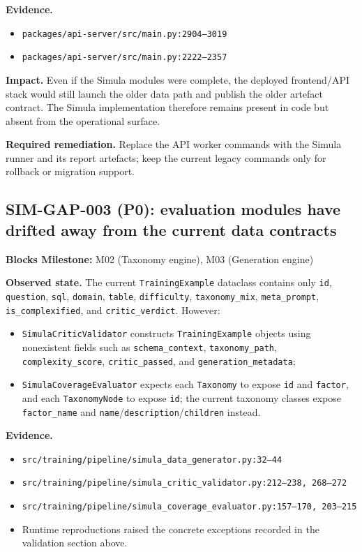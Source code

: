 \documentclass[12pt,a4paper,twoside]{report}
\begin{document}
\textbf{Evidence.}
\begin{itemize}
\item \texttt{packages/api-server/src/main.py:2904--3019}
\item \texttt{packages/api-server/src/main.py:2222--2357}
\end{itemize}

\textbf{Impact.}
Even if the Simula modules were complete, the deployed frontend/API
stack would still launch the older data path and publish the older
artefact contract. The Simula implementation therefore remains
present in code but absent from the operational surface.

\textbf{Required remediation.}
Replace the API worker commands with the Simula runner and its report
artefacts; keep the current legacy commands only for rollback or
migration support.

\subsection*{SIM-GAP-003 (P0): evaluation modules have drifted away from the current data contracts}
\label{gap:sim-003}
\textbf{Blocks Milestone:} M02 (Taxonomy engine), M03 (Generation engine)

\textbf{Observed state.}
The current \texttt{TrainingExample} dataclass contains only
\texttt{id}, \texttt{question}, \texttt{sql}, \texttt{domain},
\texttt{table}, \texttt{difficulty}, \texttt{taxonomy\_mix},
\texttt{meta\_prompt}, \texttt{is\_complexified}, and
\texttt{critic\_verdict}. However:
\begin{itemize}
\item \texttt{SimulaCriticValidator} constructs
\texttt{TrainingExample} objects using nonexistent fields such as
\texttt{schema\_context}, \texttt{taxonomy\_path},
\texttt{complexity\_score}, \texttt{critic\_passed}, and
\texttt{generation\_metadata};
\item \texttt{SimulaCoverageEvaluator} expects each
\texttt{Taxonomy} to expose \texttt{id} and \texttt{factor}, and
each \texttt{TaxonomyNode} to expose \texttt{id}; the current
taxonomy classes expose \texttt{factor\_name} and
\texttt{name}/\texttt{description}/\texttt{children} instead.
\end{itemize}

\textbf{Evidence.}
\begin{itemize}
\item \texttt{src/training/pipeline/simula\_data\_generator.py:32--44}
\item \texttt{src/training/pipeline/simula\_critic\_validator.py:212--238, 268--272}
\item \texttt{src/training/pipeline/simula\_coverage\_evaluator.py:157--170, 203--215}
\item Runtime reproductions raised the concrete exceptions recorded
in the validation section above.
\end{itemize}
\end{document}

